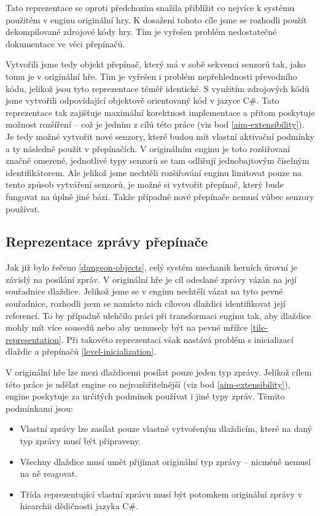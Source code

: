 Tato reprezentace se oproti předchozím snažila přiblížit co nejvíce k systému použitém v enginu originální hry.
K dosažení tohoto cíle jsme se rozhodli použít dekompilované zdrojové kódy \cite{DMDecompilation} hry. Tím
je vyřešen problém nedostatečné dokumentace ve věci přepínačů.

Vytvořili jsme tedy objekt přepínač, který má v sobě sekvenci senzorů tak, jako tomu je v originální hře.
Tím je vyřešen i problém nepřehlednosti převodního kódu, jelikož jsou tyto reprezentace téměř identické.
S využitím zdrojových kódů jsme vytvořili odpovídající objektově orientovaný kód v jazyce C\#. Tato reprezentace
tak zajišťuje maximální korektnost implementace a přitom poskytuje možnost rozšíření -- což je jedním z cílů této práce  (viz bod \ref{aim-extensibility}). 
Je tedy možné vytvořit nové senzory, které budou mít vlastní aktivační podmínky a ty následně použít v přepínačích.
V originálním enginu je toto rozšiřovaní značně omezené, jednotlivé typy senzorů se tam odlišují jednobajtovým číselným identifikátorem.
Ale jelikož jsme nechtěli rozšiřování enginu limitovat pouze na tento způsob vytváření senzorů, je možné si vytvořit přepínač, který
bude fungovat na úplně jiné bázi. Takže případné nové přepínače nemusí vůbec senzory používat. 

\subsection{Reprezentace zprávy přepínače}\label{actuator-message-representation}

Jak již bylo řečeno \vref{dungeon-objects}, celý systém mechanik herních úrovní je závislý na posílání zpráv. 
V originální hře je cíl odeslané zprávy vázán na její souřadnice dlaždice. 
Jelikož jsme se v enginu nechtěli vázat na tyto pevné souřadnice, rozhodli jsem se namísto nich
cílovou dlaždici identifikovat její referencí. To by případně ulehčilo práci při transformaci enginu tak, aby
dlaždice mohly mít více sousedů nebo aby nemusely být na pevné mřížce \vref{tile-representation}.
Při takovéto reprezentaci však nastává problém s inicializací dlaždic a přepínačů \vref{level-inicialization}.

V originální hře lze mezi dlaždicemi posílat pouze jeden typ zprávy. Jelikož cílem této práce je udělat engine
co nejrozšiřitelnější  (viz bod \ref{aim-extensibility}), engine poskytuje za určitých podmínek používat i jiné typy zpráv.
Těmito podmínkami jsou:
\begin{itemize}
\item Vlastní zprávy lze zasílat pouze vlastně vytvořeným dlaždicím, které na daný typ zprávy musí být připraveny.
\item Všechny dlaždice musí umět přijímat originální typ zprávy -- nicméně nemusí na ně reagovat.
\item Třída reprezentující vlastní zprávu musí být potomkem originální zprávy v hiearchii dědičnosti jazyka C\#.
\end{itemize}

